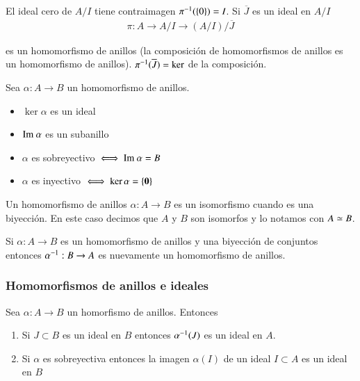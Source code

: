 El ideal cero de $A/I$ tiene contraimagen $\pi^{-1}(\{0\}) = I$. Si $\overline{J}$ es un ideal en $A/I$
\begin{align*}
	\pi : A \to A/I \to (A/I) / \overline{J}
\end{align*}

es un homomorfismo de anillos (la composición de homomorfismos de anillos es un homomorfismo de anillos). $\pi^{-1}(\overline{J}) = \ker$ de la composición.


\begin{thm}
	Sea $\alpha: A \to B$ un homomorfismo de anillos.
	\begin{itemize}
		\item $\ker \alpha$ es un ideal
		\item $\text{Im } \alpha$ es un subanillo
		\item $\alpha$ es sobreyectivo $\iff \text{Im } \alpha = B$
		\item $\alpha$ es inyectivo $\iff \ker \alpha = \{\mathbf{0}\}$
	\end{itemize}
\end{thm}

\begin{dfn}
	Un homomorfismo de anillos $\alpha: A \to B$ es un isomorfismo cuando es una biyección. En este caso decimos que $A$ y $B$ son isomorfos y lo notamos con $A \simeq B$.
\end{dfn}

\begin{pro}
	Si $\alpha: A \to B$ es un homomorfismo de anillos y una biyección de conjuntos entonces $\alpha^{-1}:B \to A$ es nuevamente un homomorfismo de anillos.
\end{pro}

\subsubsection{Homomorfismos de anillos e ideales}

\begin{thm}
	Sea $\alpha: A \to B$ un homorfismo de anillos. Entonces
	\begin{enumerate}
		\item Si $J \subset B$ es un ideal en $B$ entonces $\alpha^{-1}(J)$ es un ideal en $A$.
		\item Si $\alpha$ es sobreyectiva entonces la imagen $\alpha(I)$ de un ideal $I \subset A$ es un ideal en $B$
	\end{enumerate}
\end{thm}

